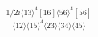 \documentclass[varwidth, border=5pt]{standalone}
\begin{document}
\begin{my}
$\begin{gathered}
\scriptscriptstyle\frac{1/2i\langle13\rangle^4[16]\langle56\rangle^4[56]}{\langle12\rangle\langle15\rangle^4\langle23\rangle\langle34\rangle\langle45\rangle}
\end{gathered}$
\end{my}
\end{document}
